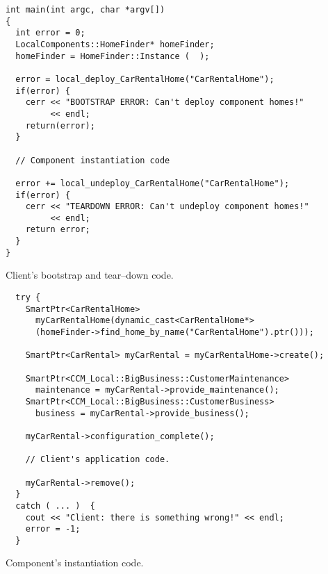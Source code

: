 \begin{Example}
\begin{minifbox}
\begin{small}
\begin{verbatim}
int main(int argc, char *argv[])
{
  int error = 0;
  LocalComponents::HomeFinder* homeFinder;
  homeFinder = HomeFinder::Instance (  );

  error = local_deploy_CarRentalHome("CarRentalHome");
  if(error) {
    cerr << "BOOTSTRAP ERROR: Can't deploy component homes!" 
         << endl;
    return(error);
  }

  // Component instantiation code

  error += local_undeploy_CarRentalHome("CarRentalHome");
  if(error) {
    cerr << "TEARDOWN ERROR: Can't undeploy component homes!" 
         << endl;
    return error;
  }
}
\end{verbatim}
\end{small}
\end{minifbox}
\caption{Client's bootstrap and tear--down code.}
\label{example:ClientBootsrap}
\end{Example}

\begin{Example}
\begin{minifbox}
\begin{small}
\begin{verbatim}
  try {
    SmartPtr<CarRentalHome> 
      myCarRentalHome(dynamic_cast<CarRentalHome*>
      (homeFinder->find_home_by_name("CarRentalHome").ptr()));

    SmartPtr<CarRental> myCarRental = myCarRentalHome->create();

    SmartPtr<CCM_Local::BigBusiness::CustomerMaintenance> 
      maintenance = myCarRental->provide_maintenance();    
    SmartPtr<CCM_Local::BigBusiness::CustomerBusiness> 
      business = myCarRental->provide_business();

    myCarRental->configuration_complete();

    // Client's application code.

    myCarRental->remove();
  } 
  catch ( ... )  {
    cout << "Client: there is something wrong!" << endl;
    error = -1;
  }
\end{verbatim}
\end{small}
\end{minifbox}
\caption{Component's instantiation code.}
\label{example:ClientComponentInstance}
\end{Example}



